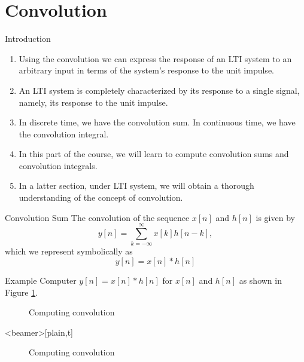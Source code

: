 \section{Convolution}

\begin{frame}{Introduction}
    \begin{enumerate}
        \item Using the convolution we can express the response of an LTI system to an arbitrary input in terms of the system's response to the unit impulse.
        \item An LTI system is completely characterized by its response to a single signal, namely, its response to the unit impulse.
        \item In discrete time, we have the convolution sum. In continuous time, we have the convolution integral.
        \item In this part of the course, we will learn to compute convolution sums and convolution integrals.
        \item In a latter section, under LTI system, we will obtain a thorough understanding of the concept of convolution.
    \end{enumerate}
\end{frame}

\begin{frame}{Convolution Sum}
    The convolution of the sequence $x[n]$ and $h[n]$ is given by
    \begin{equation}\label{eq:convolution_sum}
        y[n] = \sum_{k=-\infty}^{\infty}x[k]h[n-k],
    \end{equation}
    which we represent symbolically as
    \begin{equation}\label{eq:convolution_symbol}
        y[n] = x[n]\ast h[n]
    \end{equation}
\end{frame}

\begin{frame}{Example}
    Computer $y[n] = x[n]\ast h[n]$ for $x[n]$ and $h[n]$ as shown in Figure \ref{fi:example01_discrete_conv_signals}.
    \begin{figure}
      \centering
      
      \caption{Computing convolution}\label{fi:example01_discrete_conv_signals}
    \end{figure}        
\end{frame}

\begin{frame}<beamer>[plain,t]
    \begin{figure}
      \centering
      
      \caption{Computing convolution}\label{fi:example01_discrete_conv_01}
    \end{figure}
\end{frame}

